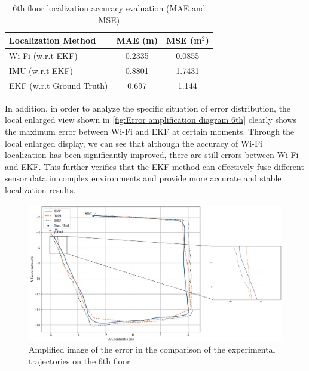 \documentclass[12pt,a4paper]{article}
\numberwithin{equation}{section}
\begin{document}
\begin{table}[htbp]
\centering
\caption{6th floor localization accuracy evaluation (MAE and MSE)}
\label{tab:accuracy_evaluation_6th_floor} %
\begin{tabular}{lcc}
\toprule
\textbf{Localization Method} & \textbf{MAE (m)} & \textbf{MSE (m$^2$)} \\
\midrule

Wi-Fi (w.r.t EKF)                       & 0.2335                             & 0.0855                             \\ 
IMU (w.r.t EKF)                           & 0.8801                             & 1.7431                             \\ 
EKF (w.r.t Ground Truth) & 0.697 & 1.144 \\
\bottomrule
\end{tabular}
\end{table}
\noindent In addition, in order to analyze the specific situation of error distribution, the local enlarged view shown in \autoref{fig:Error amplification diagram 6th} clearly shows the maximum error between Wi-Fi and EKF at certain moments. Through the local enlarged display, we can see that although the accuracy of Wi-Fi localization has been significantly improved, there are still errors between Wi-Fi and EKF. This further verifies that the EKF method can effectively fuse different sensor data in complex environments and provide more accurate and stable localization results.
\begin{figure}[H]
    \centering
    \includegraphics[width=\linewidth]{Amplification images/wifi/half_circle_low_diff.png}
    \caption{Amplified image of the error in the comparison of the experimental trajectories on the 6th floor}
     \label{fig:Error amplification diagram 6th}
\end{figure}
\end{document}
